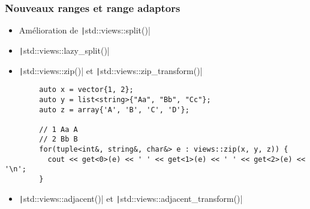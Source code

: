 \documentclass[C++.tex]{subfiles}
\begin{document}
\begin{frame}[fragile]
	\frametitle{Nouveaux ranges et range adaptors}
	\begin{itemize}
		\item Amélioration de \texttt|std::views::split()|
		\item \texttt|std::views::lazy_split()|
		\item \texttt|std::views::zip()| et \texttt|std::views::zip_transform()|
	\end{itemize}

	\begin{verbatim}
		auto x = vector{1, 2};
		auto y = list<string>{"Aa", "Bb", "Cc"};
		auto z = array{'A', 'B', 'C', 'D'};

		// 1 Aa A
		// 2 Bb B
		for(tuple<int&, string&, char&> e : views::zip(x, y, z)) {
		  cout << get<0>(e) << ' ' << get<1>(e) << ' ' << get<2>(e) << '\n';
		}
   	\end{verbatim}

	\begin{itemize}
		\item \texttt|std::views::adjacent()| et \texttt|std::views::adjacent_transform()|
	\end{itemize}

\end{frame}
\end{document}
